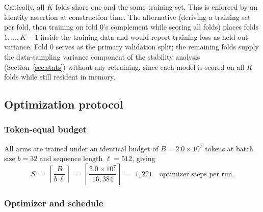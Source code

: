 \documentclass[final,5p,times,twocolumn]{elsarticle}
\theoremstyle{remark}
\begin{document}
Critically, all $K$ folds share one and the same training set. This is enforced
by an identity assertion at construction time. The alternative (deriving a
training set per fold, then training on fold $0$'s complement while scoring all
folds) places folds $1,\dots,K-1$ inside the training data and would
report training loss as held-out variance. Fold $0$ serves as the primary
validation split; the remaining folds supply the data-sampling variance
component of the stability analysis (Section~\ref{sec:stats}) without any
retraining, since each model is scored on all $K$ folds while still resident in
memory.

\subsection{Optimization protocol}
\label{sec:optim}

\subsubsection{Token-equal budget}

All arms are trained under an identical budget of
$B = 2.0\times 10^{7}$ tokens at batch size $b = 32$ and sequence length
$\ell = 512$, giving
\begin{equation}
\label{eq:steps}
S \;=\; \left\lceil \frac{B}{b\,\ell} \right\rceil
\;=\; \left\lceil \frac{2.0\times 10^{7}}{16{,}384} \right\rceil
\;=\; 1{,}221 \quad\text{optimizer steps per run.}
\end{equation}

\subsubsection{Optimizer and schedule}
\end{document}
